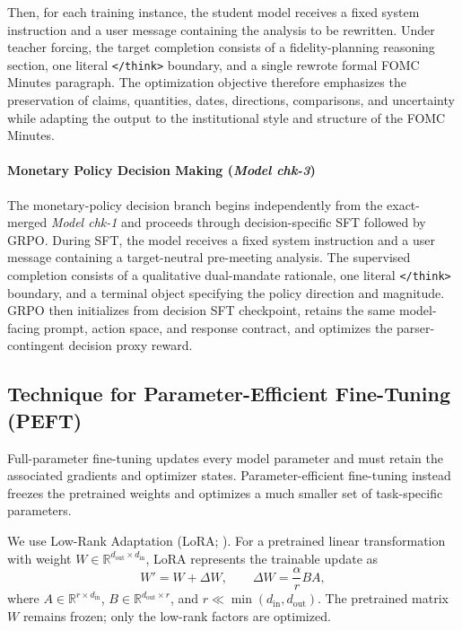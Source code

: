 Then, for each training instance, the student model receives a fixed system instruction and a user message containing the analysis to be rewritten. Under teacher forcing, the target completion consists of a fidelity-planning reasoning section, one literal \texttt{</think>} boundary, and a single rewrote formal FOMC Minutes paragraph. The optimization objective therefore emphasizes the preservation of claims, quantities, dates, directions, comparisons, and uncertainty while adapting the output to the institutional style and structure of the FOMC Minutes. 




\paragraph*{Monetary Policy Decision Making (\textit{Model chk-3})}

The monetary-policy decision branch begins independently from the exact-merged \textit{Model chk-1} and proceeds through decision-specific SFT followed by GRPO. During SFT, the model receives a fixed system instruction and a user message containing a target-neutral pre-meeting analysis. The supervised completion consists of a qualitative dual-mandate rationale, one literal \texttt{</think>} boundary, and a terminal object specifying the policy direction and magnitude. GRPO then initializes from decision SFT checkpoint, retains the same model-facing prompt, action space, and response contract, and optimizes the parser-contingent decision proxy reward. 



\subsection*{Technique for Parameter-Efficient Fine-Tuning (PEFT)}

Full-parameter fine-tuning updates every model parameter and must retain the
associated gradients and optimizer states. Parameter-efficient fine-tuning
instead freezes the pretrained weights and optimizes a much smaller set of
task-specific parameters.

We use Low-Rank Adaptation (LoRA; \cite{hu2021lora}). For a pretrained linear
transformation with weight
$W\in\mathbb{R}^{d_{\mathrm{out}}\times d_{\mathrm{in}}}$, LoRA represents
the trainable update as
\begin{equation}
    W'=W+\Delta W,
    \qquad
    \Delta W=\frac{\alpha}{r}BA,
\end{equation}
where $A\in\mathbb{R}^{r\times d_{\mathrm{in}}}$,
$B\in\mathbb{R}^{d_{\mathrm{out}}\times r}$, and
$r\ll\min(d_{\mathrm{in}},d_{\mathrm{out}})$. The pretrained matrix $W$
remains frozen; only the low-rank factors are optimized.

